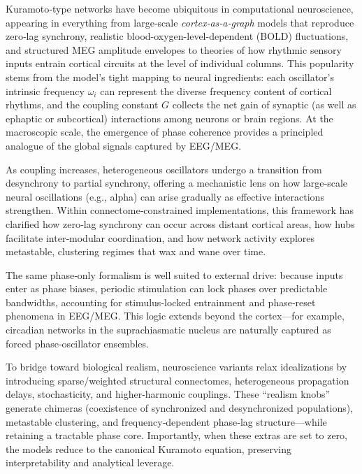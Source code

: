 \documentclass[12pt]{article}
\numberwithin{equation}{section}
\begin{document}
Kuramoto‑type networks have become ubiquitous in computational neuroscience, appearing in everything from large‑scale \textit{cortex‑as‑a‑graph} models that reproduce zero‑lag synchrony, realistic  blood-oxygen-level-dependent (BOLD) fluctuations, and structured MEG amplitude envelopes\cite{Breakspear2010,cabral_role_2011,Cabral2014MEGDelays,Cabral2014} to theories of how rhythmic sensory inputs entrain cortical circuits at the level of individual columns\cite{Buzsaki2006}. This popularity stems from the model’s tight mapping to neural ingredients: each oscillator’s intrinsic frequency $\omega_i$ can represent the diverse frequency content of cortical rhythms, and the coupling constant $G$ collects the net gain of synaptic (as well as ephaptic or subcortical) interactions among neurons or brain regions. At the macroscopic scale, the emergence of phase coherence provides a principled analogue of the global signals captured by EEG/MEG\cite{Breakspear2010,Cabral2011}.

As coupling increases, heterogeneous oscillators undergo a transition from desynchrony to partial synchrony\cite{Kuramoto1975,Acebron2005}, offering a mechanistic lens on how large‑scale neural oscillations (e.g., alpha) can arise gradually as effective interactions strengthen. Within connectome‑constrained implementations, this framework has clarified how zero‑lag synchrony can occur across distant cortical areas, how hubs facilitate inter‑modular coordination, and how network activity explores metastable, clustering regimes that wax and wane over time\cite{Schmidt2015KuramotoHubs,Shanahan2010Chimera,Hizanidis2016SciRep,Cabral2014PNB}.

The same phase‑only formalism is well suited to external drive: because inputs enter as phase biases, periodic stimulation can lock phases over predictable bandwidths, accounting for stimulus‑locked entrainment and phase‑reset phenomena in EEG/MEG\cite{Buzsaki2006}. This logic extends beyond the cortex—for example, circadian networks in the suprachiasmatic nucleus are naturally captured as forced phase‑oscillator ensembles\cite{Gu2012SCN}.

To bridge toward biological realism, neuroscience variants relax idealizations by introducing sparse/weighted structural connectomes, heterogeneous propagation delays, stochasticity, and higher‑harmonic couplings. These “realism knobs” generate chimeras (coexistence of synchronized and desynchronized populations), metastable clustering, and frequency‑dependent phase‑lag structure—while retaining a tractable phase core\cite{Shanahan2010Chimera,Hizanidis2016SciRep,Petkoski2016PRE,Petkoski2018PhaseLags,Petkoski2019PhilTransA}. Importantly, when these extras are set to zero, the models reduce to the canonical Kuramoto equation, preserving interpretability and analytical leverage.
\end{document}

